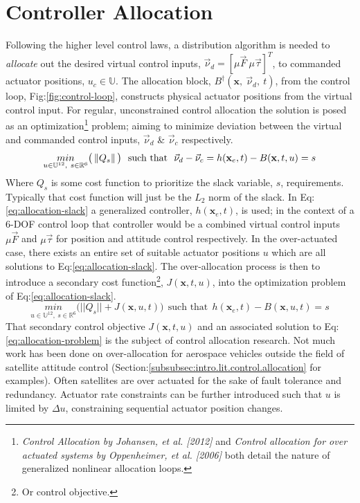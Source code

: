 {\section{Controller Allocation}
\label{sec:control.allocation}
Following the higher level control laws, a distribution algorithm is needed to \emph{allocate} out the desired virtual control inputs, $\vec{\nu}_d=[\mu\vec{F}~\mu\vec{\tau}]^T$, to commanded actuator positions, $u_c\in\mathbb{U}$. The allocation block, $B^\dagger(\mathbf{x},~\vec{\nu}_d,~t)$, from the control loop, Fig:\ref{fig:control-loop}, constructs physical actuator positions from the virtual control input. For regular, unconstrained control allocation the solution is posed as an optimization\footnote{\emph{Control Allocation by Johansen, et al. [2012]\cite{allocation}} and \emph{Control allocation for over actuated systems by Oppenheimer, et al. [2006]\cite{controlallocation}} both detail the nature of generalized nonlinear allocation loops.} problem; aiming to minimize deviation between the virtual and commanded control inputs, $\vec{\nu}_d$ \& $\vec{\nu}_c$ respectively.
\begin{equation}\label{eq:allocation-slack}
\underset{u\in\mathbb{U}^{12},~s\in\mathbb{R}^{6}}{min}\big(\left\lVert Q_s\right\rVert\big)~~\text{such that}~~\vec{\nu}_d-\vec{\nu}_c=h(\mathbf{x}_e,t)-B(\mathbf{x},t,u)=s
\end{equation}
Where $Q_s$ is some cost function to prioritize the slack variable, $s$, requirements. Typically that cost function will just be the $L_2$ norm of the slack. In Eq:\ref{eq:allocation-slack} a generalized controller, $h(\mathbf{x}_e,t)$, is used; in the context of a 6-DOF control loop that controller would be a combined virtual control inputs $\mu\vec{F}$ and $\mu\vec{\tau}$ for position and attitude control respectively. In the over-actuated case, there exists an entire set of suitable actuator positions $u$ which are all solutions to Eq:\ref{eq:allocation-slack}. The over-allocation process is then to introduce a secondary cost function\footnote{Or control objective.}, $J(\mathbf{x},t,u)$, into the optimization problem of Eq:\ref{eq:allocation-slack}.
\begin{equation}\label{eq:allocation-problem}
\underset{u\in\mathbb{U}^{12},~s\in\mathbb{R}^{6}}{min}\big(||Q_s||+J(\mathbf{x},u,t)\big)~~\text{such that}~~h(\mathbf{x}_e,t)-B(\mathbf{x},u,t)=s
\end{equation}
That secondary control objective $J(\mathbf{x},t,u)$ and an associated solution to Eq:\ref{eq:allocation-problem} is the subject of control allocation research. Not much work has been done on over-allocation for aerospace vehicles outside the field of satellite attitude control (Section:\ref{subsubsec:intro.lit.control.allocation} for examples). Often satellites are over actuated for the sake of fault tolerance and redundancy\cite{FTCallocation,discreteFTC}. Actuator rate constraints can be further introduced such that $u$ is limited by $\Delta u$, constraining sequential actuator position changes.
}
